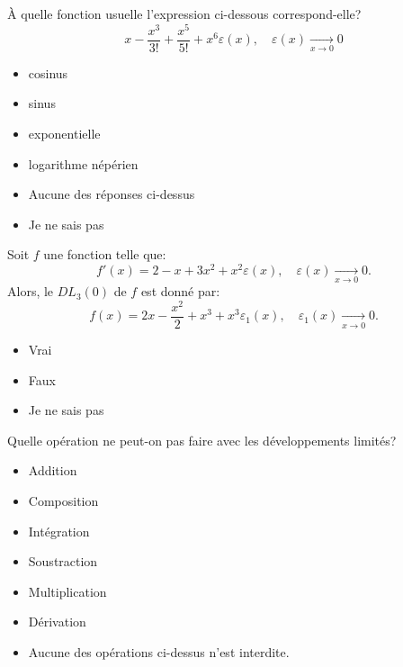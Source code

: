 
\begin{clickers}
    À quelle fonction usuelle l'expression ci-dessous correspond-elle?
    \[ x-\frac{x^3}{3!}+\frac{x^5}{5!} + x^6\varepsilon(x), \quad \varepsilon(x)\underset{x\to0}{\rightarrow}0\]
    \begin{itemize}
        \item cosinus
        \item sinus
        \item exponentielle
        \item logarithme népérien
        \item Aucune des réponses ci-dessus
        \item Je ne sais pas
    \end{itemize}
\end{clickers}



\begin{clickers}
    Soit \(f\) une fonction telle que:
    \[ f'(x) = 2-x+3x^2+x^2\varepsilon(x), \quad \varepsilon(x)\underset{x\to0}{\rightarrow}0.\]
    Alors, le \(DL_3(0)\) de \(f\) est donné par:
    \[ f(x) = 2x-\frac{x^2}{2}+x^3+x^3\varepsilon_1(x), \quad \varepsilon_1(x)\underset{x\to0}{\rightarrow}0.\]
    \begin{itemize}
        \item Vrai
        \item Faux
        \item Je ne sais pas
    \end{itemize}
\end{clickers}


\begin{clickers}
    Quelle opération ne peut-on pas faire avec les développements limités?
    \begin{itemize}
        \item Addition
        \item Composition
        \item Intégration
        \item Soustraction
        \item Multiplication
        \item Dérivation
        \item Aucune des opérations ci-dessus n'est interdite.
    \end{itemize}
\end{clickers}


